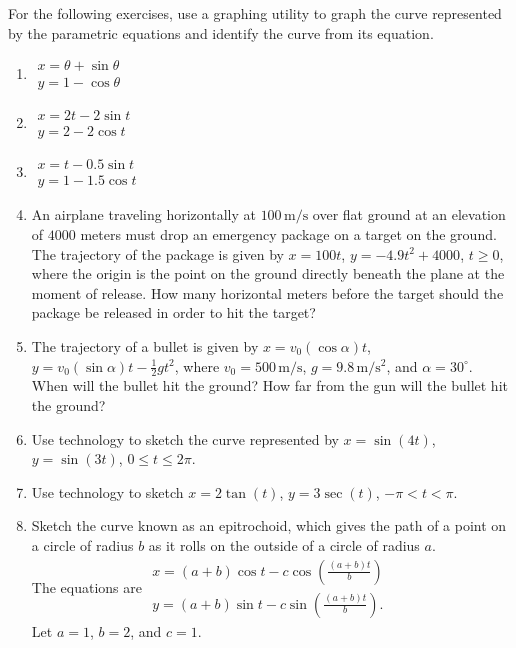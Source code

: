\documentclass{exercises}
\begin{document}
For the following exercises, use a graphing utility to graph the curve represented by the parametric equations and identify the curve from its equation.

\begin{enumerate}[resume]
\item \techrequired $\begin{array}{l}x=\theta+\sin \theta \\ y=1-\cos \theta \end{array}$
\item \techrequired $\begin{array}{l}x=2t-2\sin t \\ y=2-2\cos t\end{array}$
\item \techrequired $\begin{array}{l}x=t-0.5\sin t \\ y=1-1.5\cos t\end{array}$
\item An airplane traveling horizontally at $100\,\text{m}/\text{s}$ over flat ground at an elevation of $4000$ meters must drop an emergency package on a target on the ground. The trajectory of the package is given by $x=100t$, $y=-4.9t^{2}+4000$, $t\ge 0$, where the origin is the point on the ground directly beneath the plane at the moment of release. How many horizontal meters before the target should the package be released in order to hit the target?
\item The trajectory of a bullet is given by $x=v_{0}(\cos \alpha)t$, $y=v_{0}(\sin \alpha)t-\frac{1}{2}gt^{2}$, where $v_{0}=500\,\text{m}/\text{s}$, $g=9.8\,\text{m}/\text{s}^{2}$, and $\alpha=30^\circ$. When will the bullet hit the ground? How far from the gun will the bullet hit the ground?
\item \techrequired Use technology to sketch the curve represented by $x=\sin(4t)$, $y=\sin(3t)$, $0\le t\le 2\pi$.
\item \techrequired Use technology to sketch $x=2\tan(t)$, $y=3\sec(t)$, $-\pi<t<\pi$.
\item Sketch the curve known as an epitrochoid, which gives the path of a point on a circle of radius $b$ as it rolls on the outside of a circle of radius $a$.\\ The equations are $\begin{array}{l}x=(a+b)\cos t-c\cos\left(\frac{(a+b)t}{b}\right) \\ y=(a+b)\sin t-c\sin\left(\frac{(a+b)t}{b}\right).\end{array}$\\ Let $a=1$, $b=2$, and $c=1$.

\end{enumerate}
\end{document}
